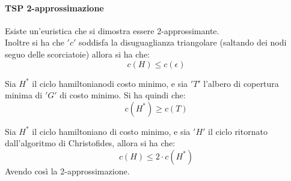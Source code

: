                             \paragraph{TSP 2-approssimazione}												      	Esiste un'euristica che si dimostra essere 2-approssimante.\\
												      	Inoltre si ha che $ 'c' $ soddisfa la disuguaglianza triangolare (saltando dei nodi
												      	seguo delle scorciatoie) allora si ha che:
												      	\[c(H)\leq c(\epsilon)\]
												      	\begin{definizione}
												      		Sia $H^*$ il ciclo hamiltonianodi costo minimo, e sia $ 'T' $ l'albero di
												      		copertura minima di $ 'G' $ di costo minimo. Si ha quindi che:
												      		\[c(H^*)\geq c(T)\]
												      	\end{definizione}
												      	\begin{definizione}
												      		Sia $H^*$ il ciclo hamiltoniano di costo minimo, e sia $ 'H' $ il ciclo ritornato
												      		dall’algoritmo di Christofides, allora si ha che:
												      		\[c(H)\leq 2\cdot c(H^*)\]
												      		Avendo così la 2-approssimazione.
												      	\end{definizione}
